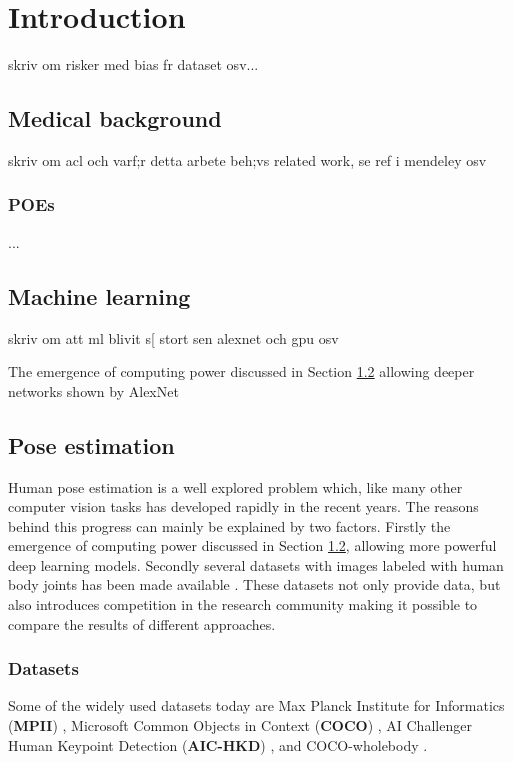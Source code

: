 \chapter{Introduction}

skriv om risker med bias fr dataset osv...

\section{Medical background}
skriv om acl och varf;r detta arbete beh;vs
related work, se ref i mendeley osv
\subsection{POEs}
...

\section{Machine learning} \label{sec:ML}
skriv om att ml blivit s[ stort sen alexnet och gpu osv

The emergence of computing power discussed in Section \ref{sec:ML} allowing deeper networks shown by AlexNet \cite{Krizhevsky2012}

\section{Pose estimation} \label{sec:pose_estimation}
Human pose estimation is a well explored problem which, like many other computer vision tasks has developed rapidly in the recent years. The reasons behind this progress can mainly be explained by two factors. Firstly the emergence of computing power discussed in Section \ref{sec:ML}, allowing more powerful deep learning models. Secondly several datasets with images labeled with human body joints has been made available \cite{Chen2020}. These datasets not only provide data, but also introduces competition in the research community making it possible to compare the results of different approaches.

\subsection{Datasets}
Some of the widely used datasets today are Max Planck Institute for Informatics (\textbf{MPII}) \cite{Andriluka2014}, Microsoft Common Objects in Context (\textbf{COCO}) \cite{Lin2014}, AI Challenger Human Keypoint Detection (\textbf{AIC-HKD}) \cite{Wu2017}, and COCO-wholebody \cite{Jin2020}.%

